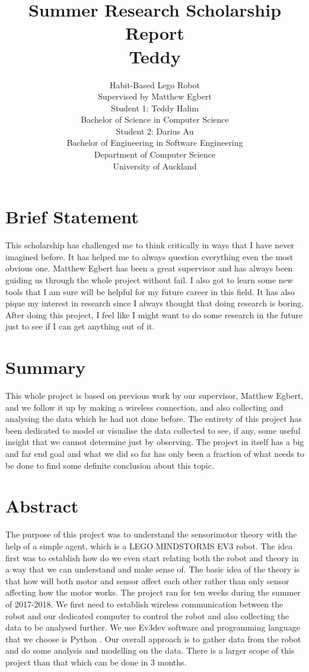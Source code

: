 \documentclass[a4paper]{article}
\title{\vspace{-2.0cm}Summer Research Scholarship Report \\ 
		Teddy}
\author{Habit-Based Lego Robot\\
		Supervised by Matthew Egbert\\[10pt]
		Student 1: Teddy Halim \\ 
		Bachelor of Science in Computer Science \\
		Student 2: Darius Au \\
		Bachelor of Engineering in Software Engineering \\[10pt]
		Department of Computer Science \\
		University of Auckland}
\begin{document}
\maketitle
\tableofcontents
\section{Brief Statement}
This scholarship has challenged me to think critically in ways that I have never imagined before. It has helped me to always question everything even the most obvious one. Matthew Egbert has been a great supervisor and has always been guiding us through the whole project without fail. I also got to learn some new tools that I am sure will be helpful for my future career in this field. It has also pique my interest in research since I always thought that doing research is boring. After doing this project, I feel like I might want to do some research in the future just to see if I can get anything out of it.
\section{Summary}
This whole project is based on previous work by our supervisor, Matthew Egbert, and we follow it up by making a wireless connection, and also collecting and analysing the data which he had not done before. The entirety of this project has been dedicated to model or visualise the data collected to see, if any, some useful insight that we cannot determine just by observing. The project in itself has a big and far end goal and what we did so far has only been a fraction of what needs to be done to find some definite conclusion about this topic.
\newpage
\section{Abstract}
The purpose of this project was to understand the sensorimotor theory with the help of a simple agent, which is a LEGO MINDSTORMS EV3 robot. The idea first was to establish how do we even start relating both the robot and theory in a way that we can understand and make sense of. The basic idea of the theory is that how will both motor and sensor affect each other rather than only sensor affecting how the motor works. The project ran for ten weeks during the summer of 2017-2018. We first need to establish wireless communication between the robot and our dedicated computer to control the robot and also collecting the data to be analysed further. We use Ev3dev software \cite{ev3dev} and programming language that we choose is Python \cite{ev3devWithPython}. Our overall approach is to gather data from the robot and do some analysis and modelling on the data. There is a larger scope of this project than that which can be done in 3 months. 
\end{document}
